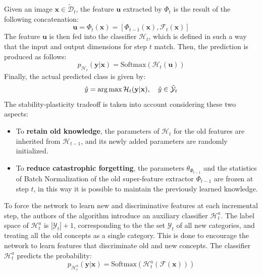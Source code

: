 Given an image $\textbf{x} \in \tilde{\mathcal{D}}_t$, the feature $\mathbf{u}$ extracted by $\Phi_t$ is the result of the following concatenation:
\begin{equation}
    \textbf{u} = \Phi_t(\textbf{x}) = [\Phi_{t-1}(\textbf{x}), \mathcal{F}_t(\mathbf{x})]
\end{equation}
The feature $\textbf{u}$ is then fed into the classifier $\mathcal{H}_t$, which is defined in such a way that the input and output dimensions for step $t$ match. Then, the prediction is produced as follows:
\begin{equation} \label{eq:classification}
    p_{\mathcal{H}_t}(\textbf{y} | \textbf{x}) = \text{Softmax}(\mathcal{H}_t(\textbf{u}))
\end{equation}
Finally, the actual predicted class is given by:
\begin{equation}
    \hat{y} = \operatorname*{arg\,max} \mathcal{H}_t(\textbf{y} | \textbf{x}), \quad \hat{y} \in \tilde{\mathcal{Y}}_t
\end{equation}
The stability-plasticity tradeoff is taken into account considering these two aspects:
\begin{itemize}
    \item To \textbf{retain old knowledge}, the parameters of $\mathcal{H}_t$ for the old features are inherited from $\mathcal{H}_{t-1}$, and its newly added parameters are randomly initialized.
    \item To \textbf{reduce catastrophic forgetting}, the parameters $\theta_{\Phi_{t-1}}$ and the statistics of Batch Normalization \cite{ioffe2015batch} of the old super-feature extractor $\Phi_{t-1}$ are frozen at step $t$, in this way it is possible to maintain the previously learned knowledge.
\end{itemize}


To force the network to learn new and discriminative features at each incremental step, the authors of the algorithm introduce an auxiliary classifier $\mathcal{H}_t^a$. The label space of $\mathcal{H}_t^a$ is $|\mathcal{Y}_t| + 1$, corresponding to the the set $\mathcal{Y}_t$ of all new categories, and treating all the old concepts as a single category. This is done to encourage the network to learn features that discriminate old and new concepts. The classifier $\mathcal{H}_t^a$ predicts the probability:
\begin{equation} \label{eq:loss-aux}
    p_{\mathcal{H}_t^a}(\textbf{y}|\textbf{x}) = \text{Softmax}(\mathcal{H}_t^a(\mathcal{F}(\textbf{x})))
\end{equation}

